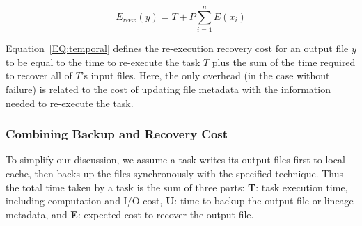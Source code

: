 \documentclass{sig-alternate}
\newcommand{\zhaonote}[1]{{\textcolor{cyan}    { ***Zhao:      #1 }}}
\newcommand{\kylenote}[1]{{\textcolor{orange}    { ***Kyle:      #1 }}}
\newcommand{\zhaonote}[1]{}
\newcommand{\kylenote}[1]{}
\begin{document}
\begin{equation}
E_{reex}(y) = T+P\sum_{i=1}^{n}E(x_i)
\label{EQ:temporal}
\end{equation}

Equation~\ref{EQ:temporal} defines the re-execution recovery cost for an output file $y$ to be
equal to the time to re-execute the task $T$ plus the sum of the time required to recover all of $T$'s
input files. Here, the only overhead (in the case without failure) is related to 
the cost of updating file metadata with the information needed to re-execute the task.

\subsubsection{Combining Backup and Recovery Cost}
To simplify our discussion, we assume a task writes its output files first to local cache, then backs up the files synchronously with the specified technique. Thus the total time taken by a task is the sum of three parts:
{\bf T}: task execution time, including computation and I/O cost,
{\bf U}: time to backup the output file or lineage metadata, %
and {\bf E}: expected cost to recover the output file. %
\end{document}
